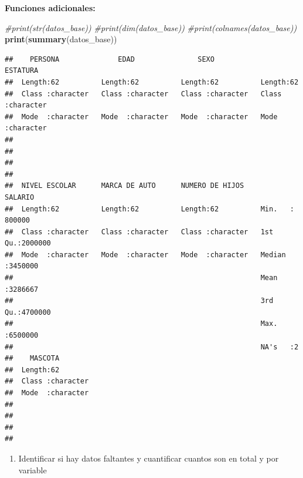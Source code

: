 \documentclass[
]{article}
\newenvironment{Shaded}{\begin{snugshade}}{\end{snugshade}}
\newcommand{\CommentTok}[1]{\textcolor[rgb]{0.56,0.35,0.01}{\textit{#1}}}
\newcommand{\FunctionTok}[1]{\textcolor[rgb]{0.13,0.29,0.53}{\textbf{#1}}}
\newcommand{\NormalTok}[1]{#1}
\providecommand{\tightlist}{%
  \setlength{\itemsep}{0pt}\setlength{\parskip}{0pt}}
\begin{document}
\textbf{Funciones adicionales:}

\begin{Shaded}
\begin{Highlighting}[]
\CommentTok{\#print(str(datos\_base))}
\CommentTok{\#print(dim(datos\_base))}
\CommentTok{\#print(colnames(datos\_base))}
\FunctionTok{print}\NormalTok{(}\FunctionTok{summary}\NormalTok{(datos\_base))}
\end{Highlighting}
\end{Shaded}

\begin{verbatim}
##    PERSONA              EDAD               SEXO             ESTATURA        
##  Length:62          Length:62          Length:62          Length:62         
##  Class :character   Class :character   Class :character   Class :character  
##  Mode  :character   Mode  :character   Mode  :character   Mode  :character  
##                                                                             
##                                                                             
##                                                                             
##                                                                             
##  NIVEL ESCOLAR      MARCA DE AUTO      NUMERO DE HIJOS       SALARIO       
##  Length:62          Length:62          Length:62          Min.   : 800000  
##  Class :character   Class :character   Class :character   1st Qu.:2000000  
##  Mode  :character   Mode  :character   Mode  :character   Median :3450000  
##                                                           Mean   :3286667  
##                                                           3rd Qu.:4700000  
##                                                           Max.   :6500000  
##                                                           NA's   :2        
##    MASCOTA         
##  Length:62         
##  Class :character  
##  Mode  :character  
##                    
##                    
##                    
## 
\end{verbatim}

\begin{enumerate}
\def\labelenumi{\alph{enumi}.}
\setcounter{enumi}{4}
\tightlist
\item
  Identificar si hay datos faltantes y cuantificar cuantos son en total
  y por variable
\end{enumerate}
\end{document}
